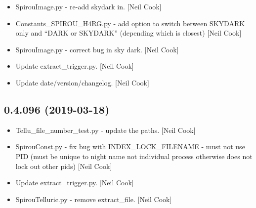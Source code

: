 \documentclass[a4paper,10pt,english]{report}
\begin{document}
\begin{itemize}
\item {} 
SpirouImage.py - re-add skydark in. {[}Neil Cook{]}

\item {} 
Constants\_SPIROU\_H4RG.py - add option to switch between SKYDARK only
and “DARK or SKYDARK” (depending which is closest) {[}Neil Cook{]}

\item {} 
SpirouImage.py - correct bug in sky dark. {[}Neil Cook{]}

\item {} 
Update extract\_trigger.py. {[}Neil Cook{]}

\item {} 
Update date/version/changelog. {[}Neil Cook{]}

\end{itemize}


\subsection{0.4.096 (2019-03-18)}
\label{\detokenize{misc/changelog:id162}}\begin{itemize}
\item {} 
Tellu\_file\_number\_test.py - update the paths. {[}Neil Cook{]}

\item {} 
SpirouConst.py - fix bug with INDEX\_LOCK\_FILENAME - must not use PID
(must be unique to night name not individual process otherwise does
not lock out other pids) {[}Neil Cook{]}

\item {} 
Update extract\_trigger.py. {[}Neil Cook{]}

\item {} 
SpirouTelluric.py - remove extract\_file. {[}Neil Cook{]}

\end{itemize}
\end{document}
